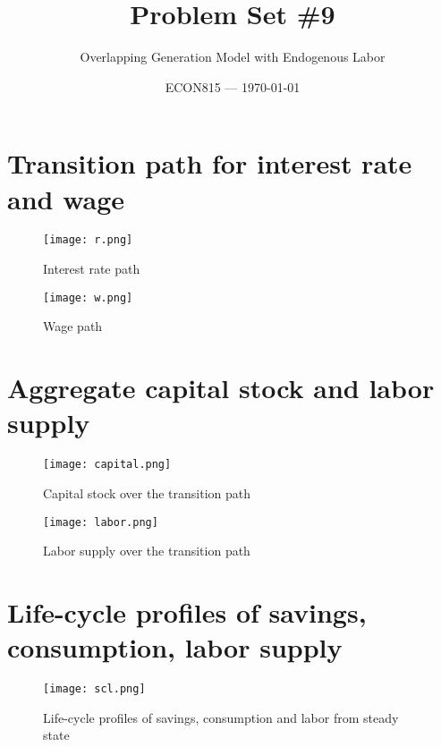 \documentclass{article}
\title{Problem Set \#9} %
\author{Overlapping Generation Model with Endogenous Labor} %
\date{ECON815 --- \today} %
\begin{document}
\maketitle %


\section*{Transition path for interest rate and wage} %


\begin{figure}[htbp]
	\begin{center}
		\texttt{[image: r.png]}
		\caption{Interest rate path}
		\label{capital}
	\end{center}
\end{figure}

\begin{figure}[htbp]
	\begin{center}
		\texttt{[image: w.png]}
		\caption{Wage path}
		\label{debt}
	\end{center}
\end{figure}


\section*{Aggregate capital stock and labor supply}

\begin{figure}[htbp]
	\begin{center}
		\texttt{[image: capital.png]}
		\caption{Capital stock over the transition path}
		\label{debt}
	\end{center}
\end{figure}

\begin{figure}[htbp]
	\begin{center}
		\texttt{[image: labor.png]}
		\caption{Labor supply over the transition path}
		\label{debt}
	\end{center}
\end{figure}


\section*{Life-cycle profiles of savings, consumption, labor supply}

\begin{figure}[htbp]
	\begin{center}
		\texttt{[image: scl.png]}
		\caption{Life-cycle profiles of savings, consumption and labor from steady state}
		\label{debt}
	\end{center}
\end{figure}


\end{document}
